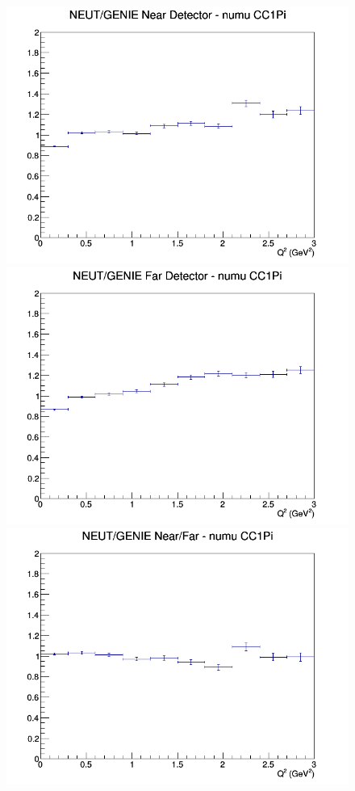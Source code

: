 \begin{figure}[h]
\endminipage
\newline
{}
\includegraphics[width=\linewidth]{eff_Q2/LAr/ratios/CC1Pi_NEUT_GENIE_numu_near_Q2.png}
\endminipage
{}
\includegraphics[width=\linewidth]{eff_Q2/LAr/ratios/CC1Pi_NEUT_GENIE_numu_far_Q2.png}
\endminipage
{}
\includegraphics[width=\linewidth]{eff_Q2/LAr/ratios/CC1Pi_NEUT_GENIE_numu_NF_Q2.png}

\end{figure}
